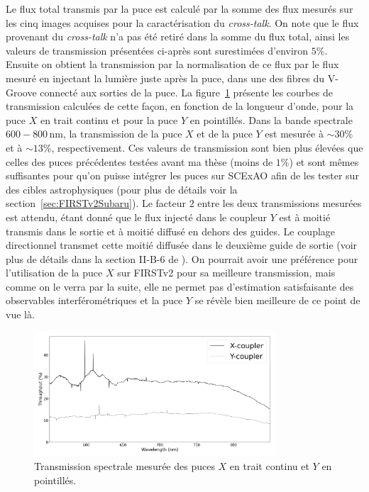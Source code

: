 
Le flux total transmis par la puce est calculé par la somme des flux mesurés sur les cinq images acquises pour la caractérisation du \textit{cross-talk}. On note que le flux provenant du \textit{cross-talk} n'a pas été retiré dans la somme du flux total, ainsi les valeurs de transmission présentées ci-après sont surestimées d'environ $5\%$. Ensuite on obtient la transmission par la normalisation de ce flux par le flux mesuré en injectant la lumière juste après la puce, dans une des fibres du V-Groove connecté aux sorties de la puce. La figure~\ref{fig:ChipThroughput} présente les courbes de transmission calculées de cette façon, en fonction de la longueur d'onde, pour la puce $X$ en trait continu et pour la puce $Y$ en pointillés. Dans la bande spectrale $600 - 800 \,$nm, la transmission de la puce $X$ et de la puce $Y$ est mesurée à $\sim 30\%$ et à $\sim 13\%$, respectivement. Ces valeurs de transmission sont bien plus élevées que celles des puces précédentes testées avant ma thèse (moins de $1\%$) et sont mêmes suffisantes pour qu'on puisse intégrer les puces sur \ac{SCExAO} afin de les tester sur des cibles astrophysiques (pour plus de détails voir la section~\ref{sec:FIRSTv2Subaru}). Le facteur $2$ entre les deux transmissions mesurées est attendu, étant donné que le flux injecté dans le coupleur $Y$ est à moitié transmis dans le sortie et à moitié diffusé en dehors des guides. Le couplage directionnel transmet cette moitié diffusée dans le deuxième guide de sortie (voir plus de détails dans la section II-B-6 de \cite{labeye2008}). On pourrait avoir une préférence pour l'utilisation de la puce $X$ sur \ac{FIRSTv2} pour sa meilleure transmission, mais comme on le verra par la suite, elle ne permet pas d'estimation satisfaisante des observables interférométriques et la puce $Y$ se révèle bien meilleure de ce point de vue là.

\begin{figure}[ht!]
    \centering
    \includegraphics[width=0.8\textwidth]{Figure_Chap2/ThroughputComparison_20201124_20201119_LaTex.png}
    \caption[Transmission spectrale mesurée des puces $X$ et $Y$.]{Transmission spectrale mesurée des puces $X$ en trait continu et $Y$ en pointillés.}
    \label{fig:ChipThroughput}
\end{figure}


